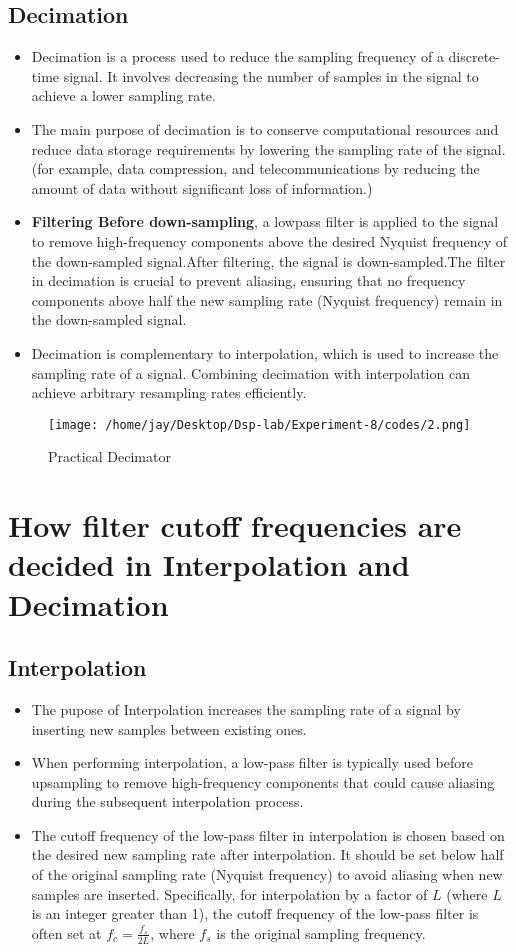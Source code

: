 \documentclass[journal,12pt,onecolumn]{IEEEtran}
\theoremstyle{remark}
\begin{document}
\subsection{Decimation}
\begin{itemize}[label=$\bullet$]
\item Decimation is a process used to reduce the sampling frequency of a discrete-time signal. It involves decreasing the number of samples in the signal to achieve a lower sampling rate.
\item The main purpose of decimation is to conserve computational resources and reduce data storage requirements by lowering the sampling rate of the signal. (for example, data compression, and telecommunications by reducing the amount of data without significant loss of information.)
\item \textbf{Filtering Before down-sampling}, a lowpass filter is applied to the signal to remove high-frequency components above the desired Nyquist frequency of the down-sampled signal.After filtering, the signal is down-sampled.The filter in decimation is crucial to prevent aliasing, ensuring that no frequency components above half the new sampling rate (Nyquist frequency) remain in the down-sampled signal.
\item Decimation is complementary to interpolation, which is used to increase the sampling rate of a signal. Combining decimation with interpolation can achieve arbitrary resampling rates efficiently.
\end{itemize}
\begin{figure}[ht] %
  \centering
  \texttt{[image: /home/jay/Desktop/Dsp-lab/Experiment-8/codes/2.png]}
  \caption{Practical Decimator}
\end{figure}
\section{How filter cutoff frequencies are decided in Interpolation and Decimation}
\subsection{Interpolation}
\begin{itemize}
    \item The pupose of Interpolation increases the sampling rate of a signal by inserting new samples between existing ones.
    \item When performing interpolation, a low-pass filter is typically used before upsampling to remove high-frequency components that could cause aliasing during the subsequent interpolation process.
    \item The cutoff frequency of the low-pass filter in interpolation is chosen based on the desired new sampling rate after interpolation. It should be set below half of the original sampling rate (Nyquist frequency) to avoid aliasing when new samples are inserted. Specifically, for interpolation by a factor of \( L \) (where \( L \) is an integer greater than 1), the cutoff frequency of the low-pass filter is often set at \(f_c = \frac{f_s}{2L} \), where \( f_s \) is the original sampling frequency.
\end{itemize}
\end{document}
